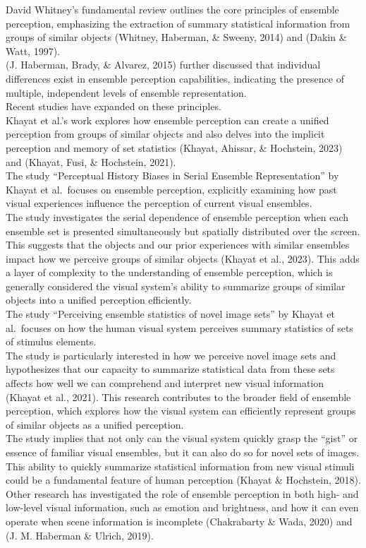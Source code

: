 \documentclass[print]{nuthesis}
\begin{document}
David Whitney's fundamental review outlines the core principles of ensemble perception, emphasizing the extraction of summary statistical information from groups of similar objects (Whitney, Haberman, \& Sweeny, 2014) and (Dakin \& Watt, 1997).\\
(J. Haberman, Brady, \& Alvarez, 2015) further discussed that individual differences exist in ensemble perception capabilities, indicating the presence of multiple, independent levels of ensemble representation.\\
Recent studies have expanded on these principles.\\
Khayat et al.'s work explores how ensemble perception can create a unified perception from groups of similar objects and also delves into the implicit perception and memory of set statistics (Khayat, Ahissar, \& Hochstein, 2023) and (Khayat, Fusi, \& Hochstein, 2021).\\
The study ``Perceptual History Biases in Serial Ensemble Representation'' by Khayat et al.~focuses on ensemble perception, explicitly examining how past visual experiences influence the perception of current visual ensembles.\\
The study investigates the serial dependence of ensemble perception when each ensemble set is presented simultaneously but spatially distributed over the screen.\\
This suggests that the objects and our prior experiences with similar ensembles impact how we perceive groups of similar objects (Khayat et al., 2023).
This adds a layer of complexity to the understanding of ensemble perception, which is generally considered the visual system's ability to summarize groups of similar objects into a unified perception efficiently.\\
The study ``Perceiving ensemble statistics of novel image sets'' by Khayat et al.~focuses on how the human visual system perceives summary statistics of sets of stimulus elements.\\
The study is particularly interested in how we perceive novel image sets and hypothesizes that our capacity to summarize statistical data from these sets affects how well we can comprehend and interpret new visual information (Khayat et al., 2021).
This research contributes to the broader field of ensemble perception, which explores how the visual system can efficiently represent groups of similar objects as a unified perception.\\
The study implies that not only can the visual system quickly grasp the ``gist'' or essence of familiar visual ensembles, but it can also do so for novel sets of images.\\
This ability to quickly summarize statistical information from new visual stimuli could be a fundamental feature of human perception (Khayat \& Hochstein, 2018).\\
Other research has investigated the role of ensemble perception in both high- and low-level visual information, such as emotion and brightness, and how it can even operate when scene information is incomplete (Chakrabarty \& Wada, 2020) and (J. M. Haberman \& Ulrich, 2019).
\end{document}
